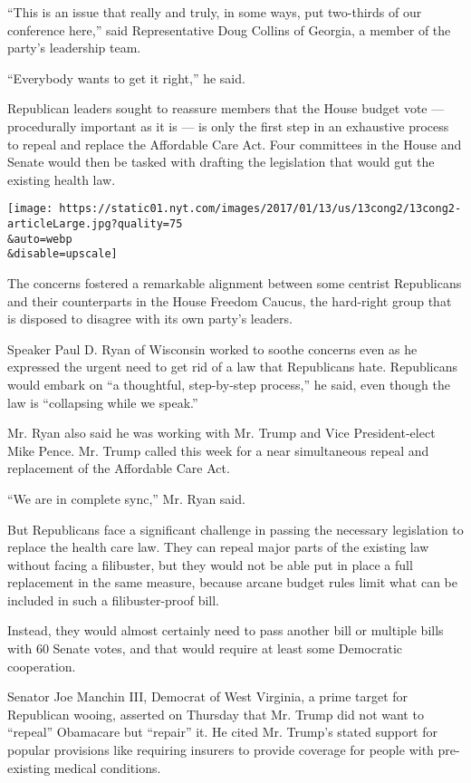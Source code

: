 ``This is an issue that really and truly, in some ways, put two-thirds
of our conference here,'' said Representative Doug Collins of Georgia, a
member of the party's leadership team.

``Everybody wants to get it right,'' he said.

Republican leaders sought to reassure members that the House budget vote
--- procedurally important as it is --- is only the first step in an
exhaustive process to repeal and replace the Affordable Care Act. Four
committees in the House and Senate would then be tasked with drafting
the legislation that would gut the existing health law.

\texttt{[image: https://static01.nyt.com/images/2017/01/13/us/13cong2/13cong2-articleLarge.jpg?quality=75\\\&auto=webp\\\&disable=upscale]}

The concerns fostered a remarkable alignment between some centrist
Republicans and their counterparts in the House Freedom Caucus, the
hard-right group that is disposed to disagree with its own party's
leaders.

Speaker Paul D. Ryan of Wisconsin worked to soothe concerns even as he
expressed the urgent need to get rid of a law that Republicans hate.
Republicans would embark on ``a thoughtful, step-by-step process,'' he
said, even though the law is ``collapsing while we speak.''

Mr. Ryan also said he was working with Mr. Trump and Vice
President-elect Mike Pence. Mr. Trump called this week for a near
simultaneous repeal and replacement of the Affordable Care Act.

``We are in complete sync,'' Mr. Ryan said.

But Republicans face a significant challenge in passing the necessary
legislation to replace the health care law. They can repeal major parts
of the existing law without facing a filibuster, but they would not be
able put in place a full replacement in the same measure, because arcane
budget rules limit what can be included in such a filibuster-proof bill.

Instead, they would almost certainly need to pass another bill or
multiple bills with 60 Senate votes, and that would require at least
some Democratic cooperation.

Senator Joe Manchin III, Democrat of West Virginia, a prime target for
Republican wooing, asserted on Thursday that Mr. Trump did not want to
``repeal'' Obamacare but ``repair'' it. He cited Mr. Trump's stated
support for popular provisions like requiring insurers to provide
coverage for people with pre-existing medical conditions.

